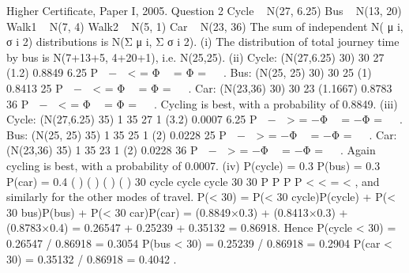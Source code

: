 Higher Certificate, Paper I, 2005. Question 2
Cycle ~ N(27, 6.25)
Bus ~ N(13, 20) Walk1 ~ N(7, 4) Walk2 ~ N(5, 1)
Car ~ N(23, 36)
The sum of independent N( μ
i, σ
i 2) distributions is N(Σ μ
i, Σ σ
i 2).
(i) The distribution of total journey time by bus is N(7+13+5, 4+20+1), i.e. N(25,25).
(ii) Cycle: (N(27,6.25) 30) 30 27 (1.2) 0.8849
6.25
P  −  < = Φ  = Φ =
 
.
Bus: (N(25, 25) 30) 30 25 (1) 0.8413
25
P  −  < = Φ  = Φ =
 
.
Car: (N(23,36) 30) 30 23 (1.1667) 0.8783
36
P  −  < = Φ  = Φ =
 
.
Cycling is best, with a probability of 0.8849.
(iii) Cycle: (N(27,6.25) 35) 1 35 27 1 (3.2) 0.0007
6.25
P  −  > = −Φ  = −Φ =
 
.
Bus: (N(25, 25) 35) 1 35 25 1 (2) 0.0228
25
P  −  > = −Φ  = −Φ =
 
.
Car: (N(23,36) 35) 1 35 23 1 (2) 0.0228
36
P  −  > = −Φ  = −Φ =
 
.
Again cycling is best, with a probability of 0.0007.
(iv) P(cycle) = 0.3 P(bus) = 0.3 P(car) = 0.4
( ) ( ) ( )
( )
30 cycle cycle
cycle 30
30
P P
P
P
<
< =
<
, and similarly for the other modes of travel.
P(< 30) = P(< 30 cycle)P(cycle) + P(< 30 bus)P(bus) + P(< 30 car)P(car)
= (0.8849×0.3) + (0.8413×0.3) + (0.8783×0.4)
= 0.26547 + 0.25239 + 0.35132 = 0.86918.
Hence P(cycle < 30) = 0.26547 / 0.86918 = 0.3054
P(bus < 30) = 0.25239 / 0.86918 = 0.2904
P(car < 30) = 0.35132 / 0.86918 = 0.4042 .
